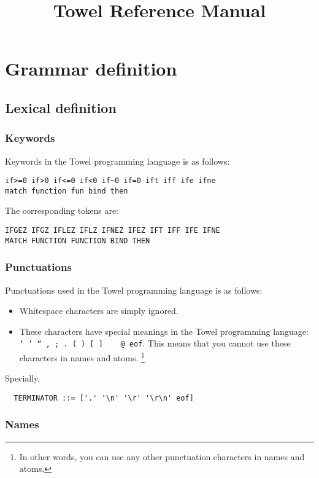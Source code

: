 \documentclass{book}
\title{Towel Reference Manual}
\begin{document}
\maketitle
\tableofcontents

\chapter{Grammar definition}
\section{Lexical definition}

\subsection{Keywords}

Keywords in the Towel programming language is as follows:
\begin{verbatim}
if>=0 if>0 if<=0 if<0 if~0 if=0 ift iff ife ifne
match function fun bind then
\end{verbatim}

The corresponding tokens are:
\begin{verbatim}
IFGEZ IFGZ IFLEZ IFLZ IFNEZ IFEZ IFT IFF IFE IFNE
MATCH FUNCTION FUNCTION BIND THEN
\end{verbatim}

\subsection{Punctuations}

Punctuations used in the Towel programming language is as follows:

\begin{itemize}
\item Whitespace characters are simply ignored.
\item These characters have special meanings in the Towel programming language: \texttt{` ' `` , ; . ( ) [ ] { } \ @ eof}. This means that you cannot use these characters in names and atoms. \footnote{In other words, you can use any other punctuation characters in names and atoms.}
\end{itemize}

Specially,
\begin{verbatim}
  TERMINATOR ::= ['.' '\n' '\r' '\r\n' eof]
\end{verbatim}

\subsection{Names}
\end{document}
